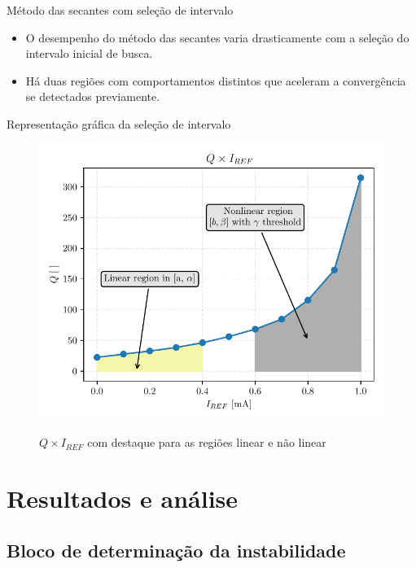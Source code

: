 \begin{frame}{Método das secantes com seleção de intervalo}

\begin{itemize}
    \item O desempenho do método das secantes varia drasticamente com a seleção do intervalo inicial de busca.
    \item Há duas regiões com comportamentos distintos que aceleram a convergência se detectados previamente.
\end{itemize}
\end{frame}

\begin{frame}{Representação gráfica da seleção de intervalo}
    


\begin{figure}[H]
    \centering
    \caption{$Q \times I_{REF}$ com destaque para as regiões linear e não linear}
    \includegraphics[width = .5\textwidth]{fig/q-iref-regions.pdf}
    \label{f-q-iref-regioes}
\end{figure}
    
\end{frame}

\begin{frame}[shrink]{}
\scriptsize
\begin{algorithm}[H]
    \scriptsize
    \caption{Método adaptado das secantes com seleção de intervalo desenvolvido}
    
    \label{alg-mod-sec}
\end{algorithm}
\end{frame}

\section{Resultados e análise}

\subsection{Bloco de determinação da instabilidade}

